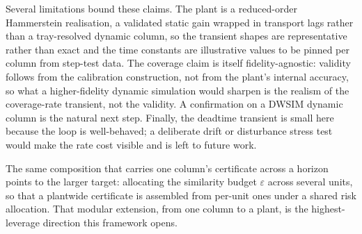 Several limitations bound these claims. The plant is a reduced-order Hammerstein realisation, a
validated static gain wrapped in transport lags rather than a tray-resolved dynamic column, so
the transient shapes are representative rather than exact and the time constants are
illustrative values to be pinned per column from step-test data. The coverage claim is itself
fidelity-agnostic: validity follows from the calibration construction, not from the plant's
internal accuracy, so what a higher-fidelity dynamic simulation would sharpen is the realism of
the coverage-rate transient, not the validity. A confirmation on a DWSIM dynamic column is the
natural next step. Finally, the deadtime transient is small here because the loop is
well-behaved; a deliberate drift or disturbance stress test would make the rate cost visible and
is left to future work.

The same composition that carries one column's certificate across a horizon points to the larger
target: allocating the similarity budget $\varepsilon$ across several units, so that a plantwide
certificate is assembled from per-unit ones under a shared risk allocation. That modular
extension, from one column to a plant, is the highest-leverage direction this framework opens.
